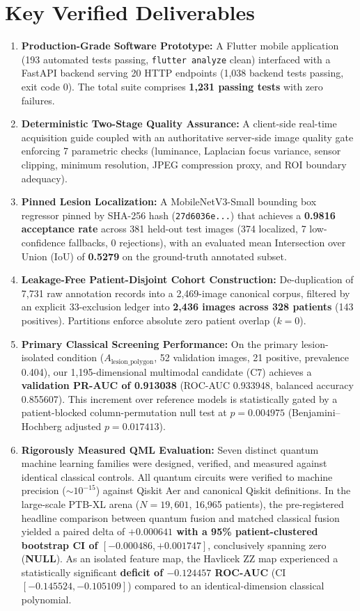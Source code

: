 \documentclass[11pt,a4paper]{report}
\newcommand{\vnull}{\textcolor{csred}{\textbf{NULL}}}
\begin{document}
\section*{Key Verified Deliverables}
\begin{enumerate}[leftmargin=*]
  \item \textbf{Production-Grade Software Prototype:} A Flutter mobile application (193 automated tests passing, \texttt{flutter analyze} clean) interfaced with a FastAPI backend serving 20 HTTP endpoints (1,038 backend tests passing, exit code 0). The total suite comprises \textbf{1,231 passing tests} with zero failures.
  \item \textbf{Deterministic Two-Stage Quality Assurance:} A client-side real-time acquisition guide coupled with an authoritative server-side image quality gate enforcing 7 parametric checks (luminance, Laplacian focus variance, sensor clipping, minimum resolution, JPEG compression proxy, and ROI boundary adequacy).
  \item \textbf{Pinned Lesion Localization:} A MobileNetV3-Small bounding box regressor pinned by SHA-256 hash (\texttt{27d6036e...}) that achieves a \textbf{0.9816 acceptance rate} across 381 held-out test images (374 localized, 7 low-confidence fallbacks, 0 rejections), with an evaluated mean Intersection over Union (IoU) of \textbf{0.5279} on the ground-truth annotated subset.
  \item \textbf{Leakage-Free Patient-Disjoint Cohort Construction:} De-duplication of 7,731 raw annotation records into a 2,469-image canonical corpus, filtered by an explicit 33-exclusion ledger into \textbf{2,436 images across 328 patients} (143 positives). Partitions enforce absolute zero patient overlap ($k=0$).
  \item \textbf{Primary Classical Screening Performance:} On the primary lesion-isolated condition ($A_\text{lesion\_polygon}$, 52 validation images, 21 positive, prevalence 0.404), our 1,195-dimensional multimodal candidate (C7) achieves a \textbf{validation PR-AUC of 0.913038} (ROC-AUC 0.933948, balanced accuracy 0.855607). This increment over reference models is statistically gated by a patient-blocked column-permutation null test at \textbf{$p = 0.004975$} (Benjamini--Hochberg adjusted $p = 0.017413$).
  \item \textbf{Rigorously Measured QML Evaluation:} Seven distinct quantum machine learning families were designed, verified, and measured against identical classical controls. All quantum circuits were verified to machine precision ($\sim 10^{-15}$) against Qiskit Aer and canonical Qiskit definitions. In the large-scale PTB-XL arena ($N = 19,601$, 16,965 patients), the pre-registered headline comparison between quantum fusion and matched classical fusion yielded a paired delta of \textbf{$+0.000641$ with a 95\% patient-clustered bootstrap CI of $[-0.000486, +0.001747]$}, conclusively spanning zero (\vnull). As an isolated feature map, the Havlicek ZZ map experienced a statistically significant \textbf{deficit of $-0.124457$ ROC-AUC} (CI $[-0.145524, -0.105109]$) compared to an identical-dimension classical polynomial.
\end{enumerate}
\end{document}
